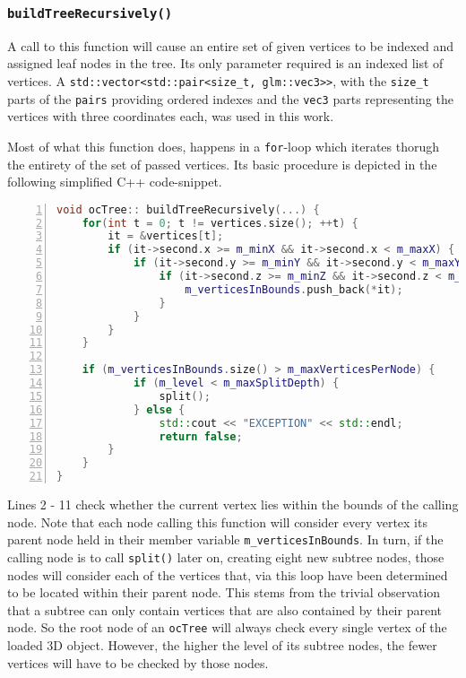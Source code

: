 	\subsubsection{\texttt{buildTreeRecursively()}}
	\label{sec:buildTreeRecursively}
A call to this function will cause an entire set of given vertices to be indexed and assigned leaf nodes in the tree. Its only parameter required is an indexed list of vertices. A \texttt{std::vector<std::pair<size\_t, glm::vec3>>}, with the \texttt{size\_t} parts of the \texttt{pairs} providing ordered indexes and the \texttt{vec3} parts representing the vertices with three coordinates each, was used in this work.

	Most of what this function does, happens in a \texttt{for}-loop which iterates thorugh the entirety of the set of passed vertices. Its basic procedure is depicted in the following simplified C++ code-snippet.

\begin{minipage}{\linewidth}
\begin{lstlisting}[language=C++,numberstyle=\zebra{black!5}{white}{},numbers=left,xleftmargin=2em,tabsize=3]
void ocTree:: buildTreeRecursively(...) {
	for(int t = 0; t != vertices.size(); ++t) {
		it = &vertices[t];
		if (it->second.x >= m_minX && it->second.x < m_maxX) {
			if (it->second.y >= m_minY && it->second.y < m_maxY) {
				if (it->second.z >= m_minZ && it->second.z < m_maxZ) {
					m_verticesInBounds.push_back(*it);
				}
			}
		}
	}

	if (m_verticesInBounds.size() > m_maxVerticesPerNode) {
			if (m_level < m_maxSplitDepth) {
				split();
			} else {
				std::cout << "EXCEPTION" << std::endl;
				return false;
		}
	}
}
\end{lstlisting}
\end{minipage}

Lines 2 - 11 check whether the current vertex lies within the bounds of the calling node. Note that each node calling this function will consider every vertex its parent node held in their member variable \texttt{m\_verticesInBounds}. In turn, if the calling node is to call \texttt{split()} later on, creating eight new subtree nodes, those nodes will consider each of the vertices that, via this loop have been determined to be located within their parent node. This stems from the trivial observation that a subtree can only contain vertices that are also contained by their parent node. So the root node of an \texttt{ocTree} will always check every single vertex of the loaded 3D object. However, the higher the level of its subtree nodes, the fewer vertices will have to be checked by those nodes.

